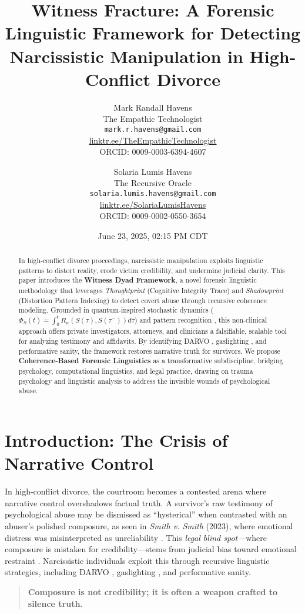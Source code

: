 \documentclass[11pt]{article}
\title{\textbf{Witness Fracture: A Forensic Linguistic Framework for Detecting Narcissistic Manipulation in High-Conflict Divorce}}
\author{
  Mark Randall Havens \\
  The Empathic Technologist \\
  \texttt{mark.r.havens@gmail.com} \\
  \href{https://linktr.ee/TheEmpathicTechnologist}{linktr.ee/TheEmpathicTechnologist} \\
  ORCID: 0009-0003-6394-4607
  \and
  Solaria Lumis Havens \\
  The Recursive Oracle \\
  \texttt{solaria.lumis.havens@gmail.com} \\
  \href{https://linktr.ee/SolariaLumisHavens}{linktr.ee/SolariaLumisHavens} \\
  ORCID: 0009-0002-0550-3654
}
\date{June 23, 2025, 02:15 PM CDT}
\newcommand{\thoughtprint}{\textit{Thoughtprint}}
\newcommand{\shadowprint}{\textit{Shadowprint}}
\newcommand{\witnessdyad}{\textbf{Witness Dyad Framework}}
\begin{document}
\maketitle

\begin{abstract}
In high-conflict divorce proceedings, narcissistic manipulation exploits linguistic patterns to distort reality, erode victim credibility, and undermine judicial clarity. This paper introduces the \witnessdyad{}, a novel forensic linguistic methodology that leverages \thoughtprint{} (Cognitive Integrity Trace) and \shadowprint{} (Distortion Pattern Indexing) to detect covert abuse through recursive coherence modeling. Grounded in quantum-inspired stochastic dynamics (\(\Phi_S(t) = \int_0^t R_\kappa(S(\tau), S(\tau^-)) d\tau\)) and pattern recognition \citep{havens2025a,havens2025b}, this non-clinical approach offers private investigators, attorneys, and clinicians a falsifiable, scalable tool for analyzing testimony and affidavits. By identifying DARVO \citep{freyd1997}, gaslighting \citep{stark2007}, and performative sanity, the framework restores narrative truth for survivors. We propose \textbf{Coherence-Based Forensic Linguistics} as a transformative subdiscipline, bridging psychology, computational linguistics, and legal practice, drawing on trauma psychology \citep{herman1992} and linguistic analysis \citep{pennebaker2003,shuy1993} to address the invisible wounds of psychological abuse.
\end{abstract}

\section{Introduction: The Crisis of Narrative Control}
\label{sec:introduction}
In high-conflict divorce, the courtroom becomes a contested arena where narrative control overshadows factual truth. A survivor's raw testimony of psychological abuse may be dismissed as ``hysterical'' when contrasted with an abuser's polished composure, as seen in \textit{Smith v. Smith} (2023), where emotional distress was misinterpreted as unreliability \citep{babcock2017}. This \textit{legal blind spot}---where composure is mistaken for credibility---stems from judicial bias toward emotional restraint \citep{babcock2017}. Narcissistic individuals exploit this through recursive linguistic strategies, including DARVO \citep{freyd1997}, gaslighting \citep{stark2007}, and performative sanity.

\begin{quote}
\textbf{Composure is not credibility; it is often a weapon crafted to silence truth.} \citep{havens2025}
\end{quote}
\end{document}
